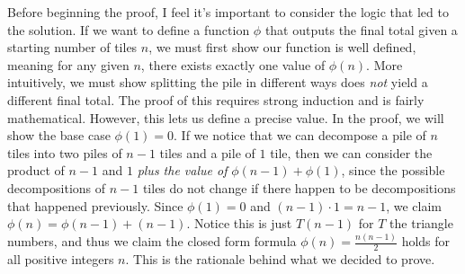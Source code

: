 \documentclass[11pt, letterpaper]{report}
\begin{document}
Before beginning the proof, I feel it's important to consider the logic that led to the solution. If we want to define a function $\phi  $ that outputs the final total given a starting number of tiles $n$, we must first show our function is well defined, meaning for any given $n$, there exists exactly one value of $\phi  (n)$. More intuitively, we must show splitting the pile in different ways does \emph{not} yield a different final total. The proof of this requires strong induction and is fairly mathematical. However, this lets us define a precise value. In the proof, we will show the base case $\phi  (1)=0$. If we notice that we can decompose a pile of $n$ tiles into two piles of $n-1$ tiles and a pile of $1$ tile, then we can consider the product of $n-1$ and $1$ \emph{plus the value of }$\phi  (n-1)+\phi  (1)$, since the possible decompositions of $n-1$ tiles do not change if there happen to be decompositions that happened previously. Since $\phi  (1)=0$ and $(n-1)\cdot 1=n-1$, we claim $\phi  (n)=\phi  (n-1)+(n-1)$. Notice this is just $T(n-1)$ for $T$ the triangle numbers, and thus we claim the closed form formula $\phi  (n)=\frac{n(n-1)}{2}$ holds for all positive integers $n$. This is the rationale behind what we decided to prove.
\end{document}
